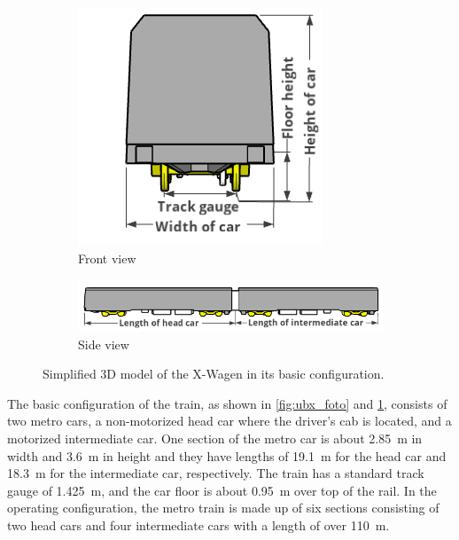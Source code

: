 \begin{figure}[H]
	\centering
	\begin{subfigure}[b]{\textwidth}
		\centering
		\includegraphics{fig/UBX_front_view_with_label_smaller.PNG}
		\caption{Front view}
	\end{subfigure}

	\begin{subfigure}[b]{\textwidth}
		\centering
		\includegraphics{fig/UBX_sketchup_model_side_view_with_label_2.PNG}
		\caption{Side view}
		\label{fig:ubx_model_sideview}
	\end{subfigure}
	
	\caption{Simplified 3D model of the X-Wagen in its basic configuration.}
	\label{fig:ubx_sketup_model}
\end{figure}

The basic configuration of the train, as shown in \cref{fig:ubx_foto} and \cref{fig:ubx_model_sideview}, consists of two metro cars, a non-motorized head car where the driver's cab is located, and a motorized intermediate car. One section of the metro car is about \SI{2.85}{\meter} in width and \SI{3.6}{\meter} in height and they have lengths of \SI{19.1}{\meter} for the head car and \SI{18.3}{\meter} for the intermediate car, respectively. The train has a standard track gauge of \SI{1.425}{\meter}, and the car floor is about \SI{0.95}{\meter} over top of the rail. In the operating configuration, the metro train is made up of six sections consisting of two head cars and four intermediate cars with a length of over \SI{110}{\meter}.

